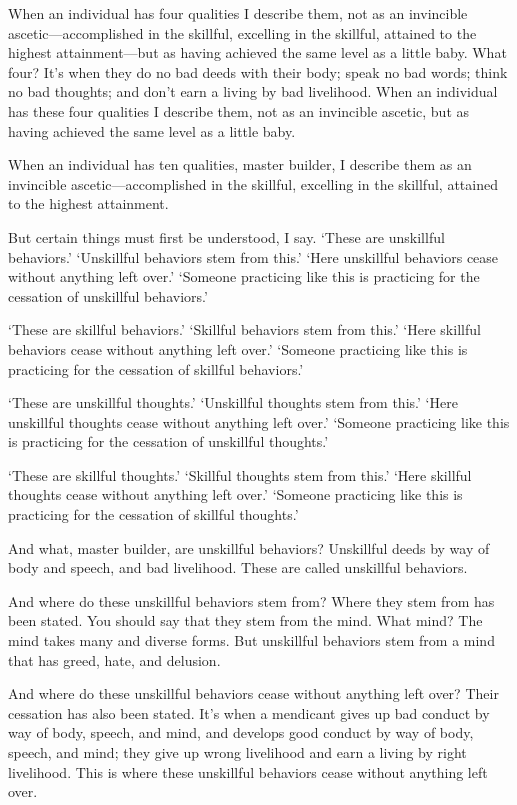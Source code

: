 \documentclass[12pt,openany]{book}%
\begin{document}
When an individual has four qualities I describe them, not as an invincible ascetic—accomplished in the skillful, excelling in the skillful, attained to the highest attainment—but as having achieved the same level as a little baby. What four? It’s when they do no bad deeds with their body; speak no bad words; think no bad thoughts; and don’t earn a living by bad livelihood. When an individual has these four qualities I describe them, not as an invincible ascetic, but as having achieved the same level as a little baby. 

When an individual has ten qualities, master builder, I describe them as an invincible ascetic—accomplished in the skillful, excelling in the skillful, attained to the highest attainment. 

But certain things must first be understood, I say. ‘These are unskillful behaviors.’ ‘Unskillful behaviors stem from this.’ ‘Here unskillful behaviors cease without anything left over.’ ‘Someone practicing like this is practicing for the cessation of unskillful behaviors.’ 

‘These are skillful behaviors.’ ‘Skillful behaviors stem from this.’ ‘Here skillful behaviors cease without anything left over.’ ‘Someone practicing like this is practicing for the cessation of skillful behaviors.’ 

‘These are unskillful thoughts.’ ‘Unskillful thoughts stem from this.’ ‘Here unskillful thoughts cease without anything left over.’ ‘Someone practicing like this is practicing for the cessation of unskillful thoughts.’ 

‘These are skillful thoughts.’ ‘Skillful thoughts stem from this.’ ‘Here skillful thoughts cease without anything left over.’ ‘Someone practicing like this is practicing for the cessation of skillful thoughts.’ 

And what, master builder, are unskillful behaviors? Unskillful deeds by way of body and speech, and bad livelihood. These are called unskillful behaviors. 

And where do these unskillful behaviors stem from? Where they stem from has been stated. You should say that they stem from the mind. What mind? The mind takes many and diverse forms. But unskillful behaviors stem from a mind that has greed, hate, and delusion. 

And where do these unskillful behaviors cease without anything left over? Their cessation has also been stated. It’s when a mendicant gives up bad conduct by way of body, speech, and mind, and develops good conduct by way of body, speech, and mind; they give up wrong livelihood and earn a living by right livelihood. This is where these unskillful behaviors cease without anything left over. 
\end{document}
